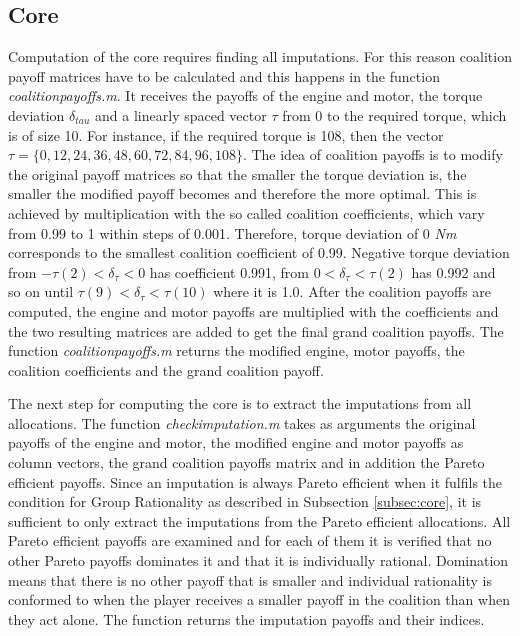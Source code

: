 \subsection{Core}
Computation of the core requires finding all imputations. For this reason coalition payoff matrices have  to be calculated and this happens in the function \textit{coalitionpayoffs.m}. It receives the payoffs of the engine and motor, the torque deviation $\delta_{tau}$ and a linearly spaced vector $\tau$ from 0 to the required torque, which is of size 10. For instance, if the required torque is 108, then the vector  $\tau = \{0,12,24,36,48,60,72,84,96,108\}$. The idea of coalition payoffs is to modify the original payoff matrices so that the smaller the torque deviation is, the smaller the modified payoff becomes and therefore the more optimal. This is achieved by multiplication with the so called coalition coefficients, which vary from 0.99 to 1 within steps of 0.001. Therefore, torque deviation of 0 \textit{Nm} corresponds to the smallest coalition coefficient of 0.99. Negative torque deviation from $-\tau(2) < \delta_{\tau} < 0$ has coefficient 0.991, from $ 0 < \delta_{\tau} < \tau(2)$ has 0.992 and so on until $\tau(9) < \delta_{\tau} < \tau(10)$ where it is 1.0. After the coalition payoffs are computed, the engine and motor payoffs are multiplied with the coefficients and the two resulting matrices are added to get the final grand coalition payoffs. The function \textit{coalitionpayoffs.m} returns the modified engine, motor payoffs, the coalition coefficients and the grand coalition payoff. 

The next step for computing the core is to extract the imputations from all allocations. The function \textit{checkimputation.m} takes as arguments the original payoffs of the engine and motor, the modified engine and motor payoffs as column vectors, the grand coalition payoffs matrix and in addition the Pareto efficient payoffs. Since an imputation is always Pareto efficient when it fulfils the condition for Group Rationality as described in Subsection \ref{subsec:core}, it is sufficient to only extract the imputations from the Pareto efficient allocations. All Pareto efficient payoffs are examined and for each of them it is verified that no other Pareto payoffs dominates it and that it is individually rational. Domination means that there is no other payoff that is smaller and individual rationality is conformed to when the player receives a smaller payoff in the coalition than when they act alone. The function returns the imputation payoffs and their indices.

